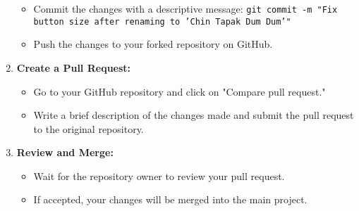 \documentclass{article}
\begin{document}
\begin{enumerate}
\begin{itemize}
        \item Commit the changes with a descriptive message: \texttt{git commit -m "Fix button size after renaming to 'Chin Tapak Dum Dum'"}
        \item Push the changes to your forked repository on GitHub.
    \end{itemize}
    \item \textbf{Create a Pull Request:}
    \begin{itemize}
        \item Go to your GitHub repository and click on "Compare pull request."
        \item Write a brief description of the changes made and submit the pull request to the original repository.
    \end{itemize}
    \item \textbf{Review and Merge:}
    \begin{itemize}
        \item Wait for the repository owner to review your pull request.
        \item If accepted, your changes will be merged into the main project.
    \end{itemize}
\end{enumerate}
\end{document}
